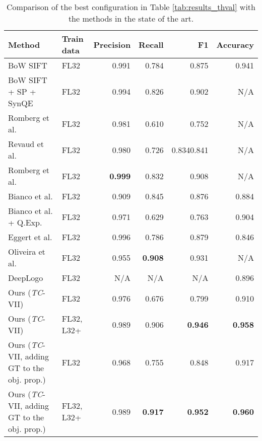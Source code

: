 \documentclass[final,5p,twocolumn]{elsarticle}
\begin{document}
\begin{table*}[htbp]
	\caption{Comparison of the best configuration in Table \ref{tab:results_thval} with the methods in the state of the art.}
	\label{tab:comparison}
	\center
\begin{tabularx}{0.97\textwidth}{ll|rrrr}
\toprule
\textbf{Method} & \textbf{Train data} & \textbf{Precision}               & \textbf{Recall}   & \textbf{F1}                 & \textbf{Accuracy} \\ \midrule
BoW SIFT \cite{romberg2013bundle}   & FL32               & 0.991              & 0.784 & 0.875              & 0.941 \\
BoW SIFT + SP + SynQE \cite{romberg2013bundle} & FL32& 0.994              & 0.826 & 0.902              & N/A   \\
Romberg et al. \cite{romberg2011scalable}   & FL32          & 0.981              & 0.610 & 0.752              & N/A   \\
Revaud et al. \cite{revaud2012correlation}  & FL32           & 0.980 & 0.726 & 0.8340.841 & N/A   \\
Romberg et al. \cite{romberg2013bundle}   & FL32          & \textbf{0.999}              & 0.832 & 0.908              & N/A   \\
Bianco et al. \cite{bianco2015logo}   & FL32          & 0.909              & 0.845 & 0.876              & 0.884   \\
Bianco et al. + Q.Exp. \cite{bianco2015logo}  & FL32           & 0.971              & 0.629 & 0.763              & 0.904   \\
Eggert et al. \cite{eggert2015benefit}  & FL32         & 0.996              & 0.786 & 0.879              & 0.846   \\
{Oliveira et al. \cite{oliveira2016automatic}}   & {FL32}          & {0.955 }               & {\textbf{0.908}}   & {0.931}                & {N/A}  \\
DeepLogo \cite{iandola2015deeplogo}   & FL32          & N/A                & N/A   & N/A                & 0.896 \\ \midrule
Ours (\emph{TC}-VII) & FL32                 & 0.976              & 0.676           & 0.799              & 0.910 \\
Ours (\emph{TC}-VII) & FL32, L32+            & 0.989              & 0.906  & \textbf{0.946}     & \textbf{0.958} \\ \midrule
Ours (\emph{TC}-VII, adding GT to the obj. prop.) & FL32            & 0.968              & 0.755           & 0.848              & 0.917 \\
Ours (\emph{TC}-VII, adding GT to the obj. prop.) & FL32, L32+        & 0.989              & \textbf{0.917}  & \textbf{0.952}     & \textbf{0.960} \\ \bottomrule
\end{tabularx}
\end{table*}
\end{document}
